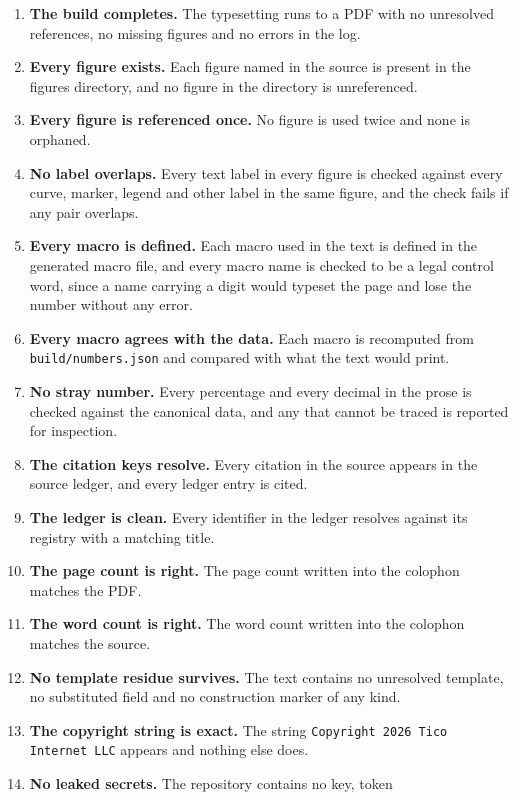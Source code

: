 \begin{enumerate}
\item \textbf{The build completes.} The typesetting runs to a PDF with no
unresolved references, no missing figures and no errors in the log.
\item \textbf{Every figure exists.} Each figure named in the source is
present in the figures directory, and no figure in the directory is
unreferenced.
\item \textbf{Every figure is referenced once.} No figure is used twice
and none is orphaned.
\item \textbf{No label overlaps.} Every text label in every figure is
checked against every curve, marker, legend and other label in the same
figure, and the check fails if any pair overlaps.
\item \textbf{Every macro is defined.} Each 
macro used in the text is defined in the generated macro file, and every
macro name is checked to be a legal control word, since a name carrying a
digit would typeset the page and lose the number without any error.
\item \textbf{Every macro agrees with the data.} Each macro is
recomputed from \texttt{build/numbers.json} and compared with what the
text would print.
\item \textbf{No stray number.} Every percentage and every decimal in the
prose is checked against the canonical data, and any that cannot be
traced is reported for inspection.
\item \textbf{The citation keys resolve.} Every citation in the source
appears in the source ledger, and every ledger entry is cited.
\item \textbf{The ledger is clean.} Every identifier in the ledger
resolves against its registry with a matching title.
\item \textbf{The page count is right.} The page count written into the
colophon matches the PDF.
\item \textbf{The word count is right.} The word count written into the
colophon matches the source.
\item \textbf{No template residue survives.} The text contains no
unresolved template, no substituted field and no construction marker of any
kind.
\item \textbf{The copyright string is exact.} The string
\texttt{Copyright 2026 Tico Internet LLC} appears and nothing else does.
\item \textbf{No leaked secrets.} The repository contains no key, token

\end{enumerate}
